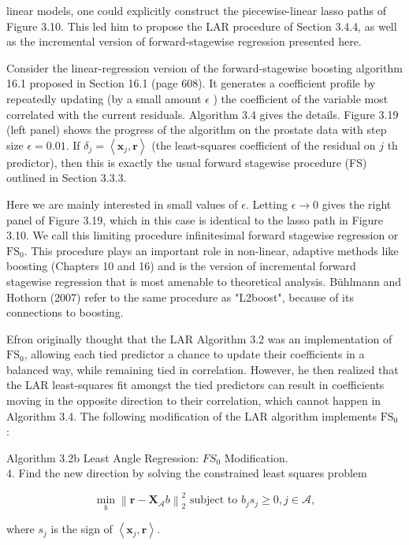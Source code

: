 \documentclass[10pt]{article}
\begin{document}
linear models, one could explicitly construct the piecewise-linear lasso paths of Figure 3.10. This led him to propose the LAR procedure of Section 3.4.4, as well as the incremental version of forward-stagewise regression presented here.

Consider the linear-regression version of the forward-stagewise boosting algorithm 16.1 proposed in Section 16.1 (page 608). It generates a coefficient profile by repeatedly updating (by a small amount $\epsilon$ ) the coefficient of the variable most correlated with the current residuals. Algorithm 3.4 gives the details. Figure 3.19 (left panel) shows the progress of the algorithm on the prostate data with step size $\epsilon=0.01$. If $\delta_{j}=\left\langle\mathbf{x}_{j}, \mathbf{r}\right\rangle$ (the least-squares coefficient of the residual on $j$ th predictor), then this is exactly the usual forward stagewise procedure (FS) outlined in Section 3.3.3.

Here we are mainly interested in small values of $\epsilon$. Letting $\epsilon \rightarrow 0$ gives the right panel of Figure 3.19, which in this case is identical to the lasso path in Figure 3.10. We call this limiting procedure infinitesimal forward stagewise regression or $\mathrm{FS}_{0}$. This procedure plays an important role in non-linear, adaptive methods like boosting (Chapters 10 and 16) and is the version of incremental forward stagewise regression that is most amenable to theoretical analysis. Bühlmann and Hothorn (2007) refer to the same procedure as "L2boost", because of its connections to boosting.

Efron originally thought that the LAR Algorithm 3.2 was an implementation of $\mathrm{FS}_{0}$, allowing each tied predictor a chance to update their coefficients in a balanced way, while remaining tied in correlation. However, he then realized that the LAR least-squares fit amongst the tied predictors can result in coefficients moving in the opposite direction to their correlation, which cannot happen in Algorithm 3.4. The following modification of the LAR algorithm implements $\mathrm{FS}_{0}$ :

Algorithm 3.2b Least Angle Regression: $F S_{0}$ Modification.\\
4. Find the new direction by solving the constrained least squares problem

$$
\min _{b}\left\|\mathbf{r}-\mathbf{X}_{\mathcal{A}} b\right\|_{2}^{2} \text { subject to } b_{j} s_{j} \geq 0, j \in \mathcal{A},
$$

where $s_{j}$ is the sign of $\left\langle\mathbf{x}_{j}, \mathbf{r}\right\rangle$.
\end{document}
